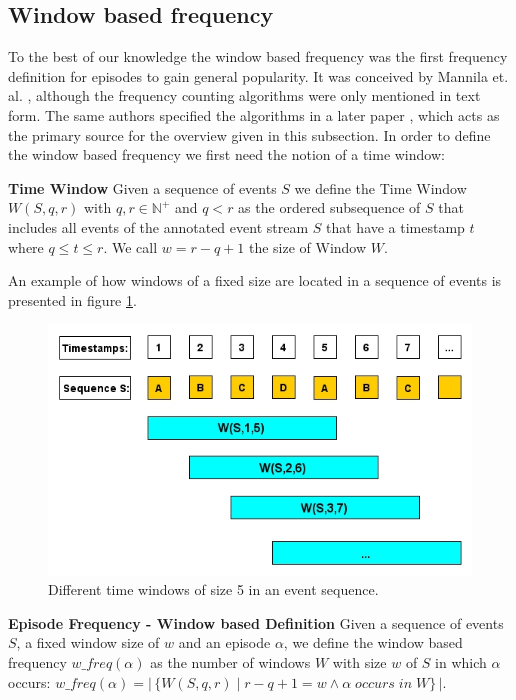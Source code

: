 \subsection{Window based frequency}
\label{subsec_windowBased}
To the best of our knowledge the window based frequency was the first frequency definition for episodes to gain general popularity. It was conceived by Mannila et. al. \cite{mannila1995discovering}, although the frequency counting algorithms were only mentioned in text form. The same authors  specified the algorithms in a later paper \cite{mannila1997discovery}, which acts as the primary source for the overview given in this subsection. In order to define the window based frequency we first need the notion of a time window: 

\begin{mydef}
\label{def_timeWindow}
\textbf{Time Window} Given a sequence of events $S$ we define the Time Window $W(S,q,r)$ with $q,r \in \mathbb{N}^+$ and $q < r$ as the ordered subsequence of $S$ that includes all events of the annotated event stream $S$ that have a timestamp $t$ where $q \leq t\leq r$. We call $w = r-q+1$ the size of Window $W$.
\end{mydef}

An example of how windows of a fixed size are located in a sequence of events is presented in figure \ref{fig_windowBasedFrequency}.

\begin{figure}[h]
	\centering
  	\includegraphics[width=\textwidth]{windowBasedFrequency}
	\caption{Different time windows of size 5 in an event sequence.}
	\label{fig_windowBasedFrequency}
\end{figure}


\begin{mydef}
\label{def_windowBasedFrequency}
\textbf{Episode Frequency - Window based Definition} Given a sequence of events $S$, a fixed window size of $w$ and an episode $\alpha$, we define the window based frequency $w\_freq(\alpha )$ as the number of windows $W$ with size $w$ of $S$ in which $\alpha$ occurs: $w\_freq(\alpha ) = |\,\{W(S,q,r) \mid r-q+1 = w \land \alpha \;occurs\; in\; W \}\,|$. %
\end{mydef}


